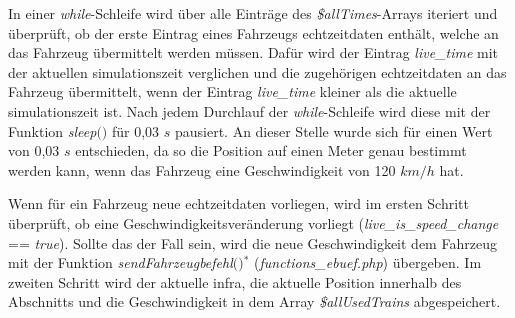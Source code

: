 In einer \textit{while}-Schleife wird über alle Einträge des \textit{\$allTimes}-Arrays iteriert und überprüft, ob der erste Eintrag eines Fahrzeugs \Gls{echtzeitdaten} enthält, welche an das Fahrzeug übermittelt werden müssen. Dafür wird der Eintrag \textit{live\_time} mit der aktuellen \Gls{simulationszeit} verglichen und die zugehörigen  \Gls{echtzeitdaten} an das Fahrzeug übermittelt, wenn der Eintrag \textit{live\_time} kleiner als die aktuelle \Gls{simulationszeit} ist. Nach jedem Durchlauf der \textit{while}-Schleife wird diese mit der Funktion \textit{sleep$($$)$} für 0,03 $s$ pausiert. An dieser Stelle wurde sich für einen Wert von 0,03 $s$ entschieden, da so die Position auf einen Meter genau bestimmt werden kann, wenn das Fahrzeug eine Geschwindigkeit von 120 $km/h$ hat.

Wenn für ein Fahrzeug neue \Gls{echtzeitdaten} vorliegen, wird im ersten Schritt überprüft, ob eine Geschwindigkeitsveränderung vorliegt (\textit{live\_is\_speed\_change} == \textit{true}). Sollte das der Fall sein, wird die neue Geschwindigkeit dem Fahrzeug mit der Funktion \textit{sendFahrzeugbefehl$($$)$}$^\ast$ (\textit{functions\_ebuef.php}) übergeben. Im zweiten Schritt wird der aktuelle \ac{infra}, die aktuelle Position innerhalb des Abschnitts und die Geschwindigkeit in dem Array \textit{\$allUsedTrains} abgespeichert. 


